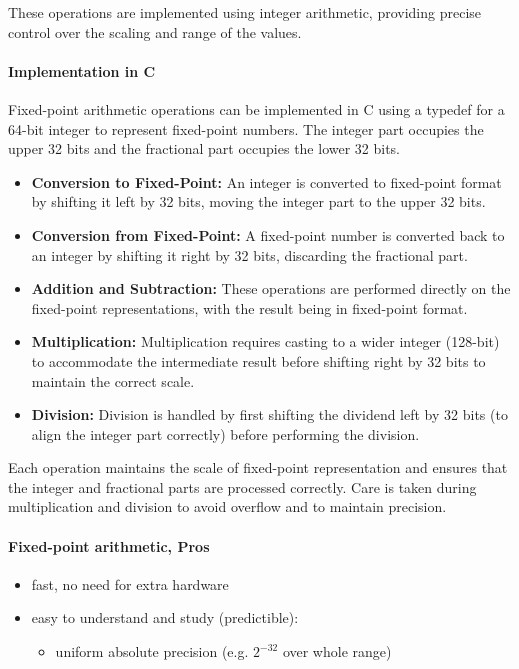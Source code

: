 \documentclass[12pt]{article}
\begin{document}
These operations are implemented using integer arithmetic, providing precise control over the scaling and range of the values.

\paragraph{Implementation in C}

Fixed-point arithmetic operations can be implemented in C using a typedef for a 64-bit integer to represent fixed-point numbers. The integer part occupies the upper 32 bits and the fractional part occupies the lower 32 bits. 

\begin{itemize}
    \item \textbf{Conversion to Fixed-Point:} An integer is converted to fixed-point format by shifting it left by 32 bits, moving the integer part to the upper 32 bits.
    \item \textbf{Conversion from Fixed-Point:} A fixed-point number is converted back to an integer by shifting it right by 32 bits, discarding the fractional part.
    \item \textbf{Addition and Subtraction:} These operations are performed directly on the fixed-point representations, with the result being in fixed-point format.
    \item \textbf{Multiplication:} Multiplication requires casting to a wider integer (128-bit) to accommodate the intermediate result before shifting right by 32 bits to maintain the correct scale.
    \item \textbf{Division:} Division is handled by first shifting the dividend left by 32 bits (to align the integer part correctly) before performing the division.
\end{itemize}

Each operation maintains the scale of fixed-point representation and ensures that the integer and fractional parts are processed correctly. Care is taken during multiplication and division to avoid overflow and to maintain precision.


\paragraph{Fixed-point arithmetic, Pros}
\begin{itemize}
    \item fast, no need for extra hardware
    \item easy to understand and study (predictible):
    \begin{itemize}
        \item uniform absolute precision (e.g. $2^{-32}$ over whole range)
    \end{itemize}
\end{itemize}
\end{document}
